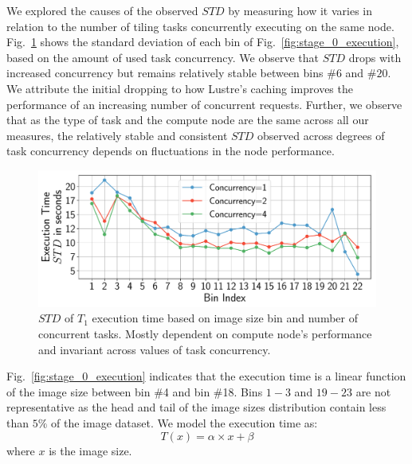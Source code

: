 We explored the causes of the observed $STD$ by measuring how it varies in
relation to the number of tiling tasks concurrently executing on the same node.
Fig.~\ref{fig:concurrency_test} shows the standard deviation of each bin of
Fig.~\ref{fig:stage_0_execution}, based on the amount of used task concurrency.
We observe that $STD$ drops with increased concurrency but remains relatively
stable between bins $\#6$ and $\#20$. We attribute the initial dropping to how
Lustre's caching improves the performance of an increasing number of
concurrent requests. Further, we observe that as the type of task and the
compute node are the same across all our measures, the relatively stable and
consistent $STD$ observed across degrees of task concurrency depends on
fluctuations in the node performance.

\begin{figure}[t]
    \centering
    \includegraphics[width=.75\textwidth]{figures/designs/concerrency_std.pdf}
    \caption{$STD$ of $T_{1}$ execution time based on image size bin and
    number of concurrent tasks. Mostly dependent on compute node's performance
    and invariant across values of task concurrency.}
    \label{fig:concurrency_test}
\end{figure}

Fig.~\ref{fig:stage_0_execution} indicates that the execution time is a linear
function of the image size between bin \#4 and bin \#18. Bins $1-3$ and
$19-23$ are not representative as the head and tail of the image sizes
distribution contain less than $5\%$ of the image dataset. We model the
execution time as:
\begin{equation}
T(x) = \alpha \times x+\beta
\label{eq:des1_til}
\end{equation} where $x$ is the image size.

